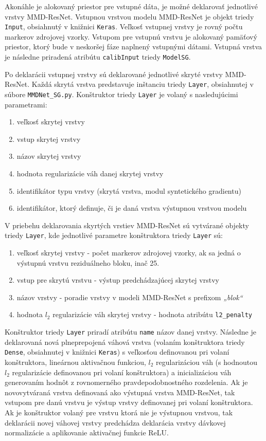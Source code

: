 Akonáhle je alokovaný priestor pre vstupné dáta, je možné deklarovať jednotlivé vrstvy MMD-ResNet. Vstupnou vrstvou modelu MMD-ResNet je objekt triedy \texttt{Input}, obsiahnutý v knižnici \texttt{Keras}. Veľkosť vstupnej vrstvy je rovný počtu markerov zdrojovej vzorky. Vstupom pre vstupnú vrstvu je alokovaný pamäťový priestor, ktorý bude v neskoršej fáze naplnený vstupnými dátami. Vstupná vrstva je následne priradená atribútu \texttt{calibInput} triedy \texttt{ModelSG}.

Po deklarácii vstupnej vrstvy sú deklarované jednotlivé skryté vrstvy MMD-ResNet. Každá skrytá vrstva predstavuje inštanciu triedy \texttt{Layer}, obsiahnutej v súbore \texttt{MMDNet_SG.py}. Konštruktor triedy \texttt{Layer} je volaný s nasledujúcimi parametrami:
\begin{enumerate}
    \item veľkosť skrytej vrstvy
    \item vstup skrytej vrstvy
    \item názov skrytej vrstvy
    \item hodnota regularizácie váh danej skrytej vrstvy
    \item identifikátor typu vrstvy (skrytá vrstva, modul syntetického gradientu)
    \item identifikátor, ktorý definuje, či je daná vrstva výstupnou vrstvou modelu
\end{enumerate}
V priebehu deklarovania skyrtých vrstiev MMD-ResNet sú vytvárané objekty triedy \texttt{Layer}, kde jednotlivé parametre konštruktora triedy \texttt{Layer} sú:
\begin{enumerate}
    \item veľkosť skrytej vrstvy - počet markerov zdrojovej vzorky, ak sa jedná o výstupnú vrstvu reziduálneho bloku, inač 25.
    \item vstup pre skrytú vrstvu - výstup predchádzajúcej skrytej vrstvy
    \item názov vrstvy - poradie vrstvy v modeli MMD-ResNet s prefixom \textit{„blok“}
    \item hodnota $l_2$ regularizácie váh skrytej vrstvy - hodnota atribútu \texttt{l2_penalty}
\end{enumerate}

Konštruktor triedy \texttt{Layer} priradí atribútu \texttt{name} názov danej vrstvy. Následne je deklarovaná nová plneprepojená váhová vrstva (volaním konštruktora triedy \texttt{Dense}, obsiahnutej v knižnici \texttt{Keras}) s veľkosťou definovanou pri volaní konštruktora, lineárnou aktivačnou funkciou, $l_2$ regularizáciou váh (s hodnoutou $l_2$ regularizácie definovanou pri volaní konštruktora) a inicializáciou váh generovaním hodnôt z rovnomerného pravdepodobnostného rozdelenia. Ak je novovytváraná vrstva definovaná ako výstupná vrstva MMD-ResNet, tak vstupom pre danú vrstvu je výstup vrstvy definovanej pri volaní konštruktora. Ak je konštruktor volaný pre vrstvu ktorá nie je výstupnou vrstvou, tak deklarácii novej váhovej vrstvy predchádza deklarácia vrstvy dávkovej normalizácie a aplikovanie aktivačnej funkcie ReLU. 

